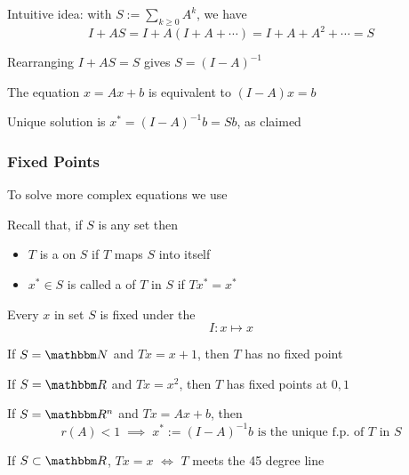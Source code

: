 \begin{frame}
    
    Intuitive idea: with $S := \sum_{k \geq 0} A^k$, we have
    \begin{equation*}
        I + AS 
        = I + A (I + A + \cdots)
        = I + A + A^2 + \cdots 
        = S
    \end{equation*}

    Rearranging $I + AS = S$ gives $S = (I - A)^{-1}$
            \vspace{0.5em}

    The equation $x = Ax + b$ is equivalent to $(I - A)x = b$
            \vspace{0.5em}

    Unique solution is $x^* = (I-A)^{-1} b = S b$, as claimed
            \vspace{0.5em}

\end{frame}


\begin{frame}
    \frametitle{Fixed Points}    

    To solve more complex equations we use 

            \vspace{0.4em}
    Recall that, if $S$ is any set then
    \begin{itemize}
        \item $T$ is a  on $S$ if $T$ maps $S$ into itself
            \vspace{0.4em}
        \item  $x^* \in S$ is called a
             of $T$ in $S$ if $T x^* = x^*$  
    \end{itemize}

            \vspace{0.4em}
    \Eg Every $x$ in set $S$ is fixed under the 
    \begin{equation*}
        I \colon x \mapsto x
    \end{equation*}

    \vspace{1em}
    \Eg If $S = \NN$ and $Tx = x+1$, then $T$ has no fixed point


\end{frame}


\begin{frame}
    
    \Eg If $S = \RR$ and $Tx = x^2$, then $T$ has fixed points at $0, 1$

    \vspace{1em}
    \Eg If $S = \RR^n$ and $Tx = Ax + b$,  then
    \begin{equation*}
        r(A) < 1 
        \; \implies \;
        x^* := (I-A)^{-1} b 
        \text{ is the unique f.p.\ of $T$ in $S$}
    \end{equation*}

    \vspace{1em}
    \Eg If $S \subset \RR$,  $Tx =x$ $\iff$ $T$ meets the 45 degree line

\end{frame}



